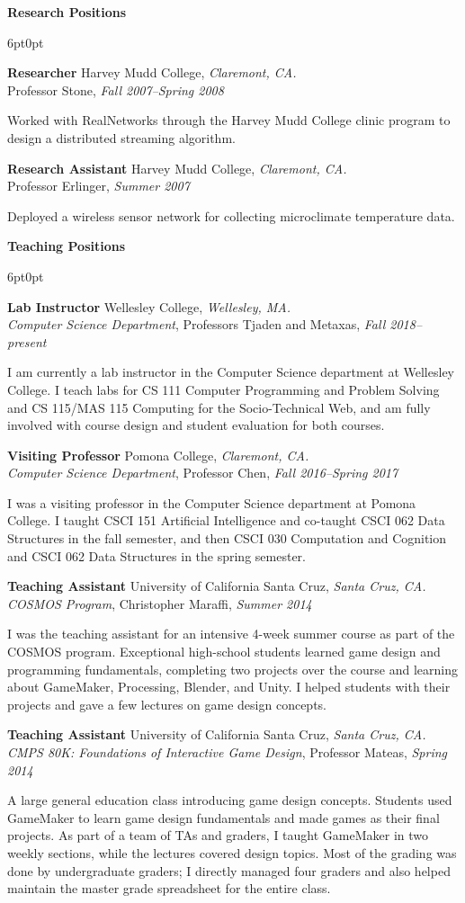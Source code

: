 \documentclass[11pt]{article}
\newenvironment{sct}[1]{%
  \vspace{8pt plus 2pt minus 4pt}\textbf{\Large #1} \hrulefill\vspace{6pt}
  \begin{adjustwidth}{6pt}{0pt}
}{%
  \end{adjustwidth}
}
\newcommand{\indented}[1]{\hspace*{\fill}\parbox{\textwidth-22pt}{#1}}
\newcommand{\experience}[6]{%
  \textbf{#1} #2, \textit{#3.} \\
  #4, \textit{#5} \\
  \indented{#6}
  \vspace{7pt plus 2pt minus 2pt}
}
\newcommand{\teachingexperience}[7]{%
  \textbf{#1} #2, \textit{#3.} \\
  \textit{#4}, #5, \textit{#6} \\
  \indented{#7}
  \vspace{7pt plus 2pt minus 2pt}
}
\newcommand{\combexp}[4]{%
  \textbf{#1} #2, \textit{#3.} \\
  #4 \vspace{7pt plus 2pt minus 2pt}
}
\begin{document}
\begin{sct}{Research Positions}
\experience{Researcher}{Harvey Mudd College}{Claremont, CA}%
{Professor Stone}{Fall 2007--Spring 2008}{
  Worked with RealNetworks through the Harvey Mudd College clinic
  program to design a distributed streaming algorithm.
}

\experience{Research Assistant}{Harvey Mudd College}{Claremont, CA}%
{Professor Erlinger}{Summer 2007}{
  Deployed a wireless sensor network for collecting microclimate
  temperature data.
}

\end{sct}

\begin{sct}{Teaching Positions}

\teachingexperience{Lab Instructor}{Wellesley College}{Wellesley, MA}%
{Computer Science Department}{Professors Tjaden and Metaxas}{Fall 2018--present}%
{I am currently a lab instructor in the Computer Science department at
  Wellesley College. I teach labs for CS 111 Computer Programming and
  Problem Solving and CS 115/MAS 115 Computing for the Socio-Technical
  Web, and am fully involved with course design and student evaluation
  for both courses.}

\teachingexperience{Visiting Professor}{Pomona College}{Claremont, CA}%
{Computer Science Department}{Professor Chen}{Fall 2016--Spring 2017}%
{I was a visiting professor in the Computer Science department at Pomona
  College. I taught CSCI 151 Artificial Intelligence and co-taught CSCI
  062 Data Structures in the fall semester, and then CSCI 030
  Computation and Cognition and CSCI 062 Data Structures in the spring
  semester.}

\teachingexperience{Teaching Assistant}{University of California Santa Cruz}{Santa Cruz, CA}%
{COSMOS Program}{Christopher Maraffi}{Summer 2014}
{I was the teaching assistant for an intensive 4-week summer course as
  part of the COSMOS program. Exceptional high-school students learned
  game design and programming fundamentals, completing two projects over
  the course and learning about GameMaker, Processing, Blender, and
  Unity. I helped students with their projects and gave a few lectures
  on game design concepts.}

\combexp{Teaching Assistant}{University of California Santa Cruz}{Santa Cruz, CA}%
{
\textit{CMPS 80K: Foundations of Interactive Game Design}, Professor Mateas, \textit{Spring 2014} \\
\indented{
  A large general education class introducing game design concepts.
  Students used GameMaker to learn game design fundamentals and made
  games as their final projects. As part of a team of TAs and graders, I
  taught GameMaker in two weekly sections, while the lectures covered
  design topics. Most of the grading was done by undergraduate graders;
  I directly managed four graders and also helped maintain the master
  grade spreadsheet for the entire class.
}
\vspace{6pt}

}
\end{sct}
\end{document}
